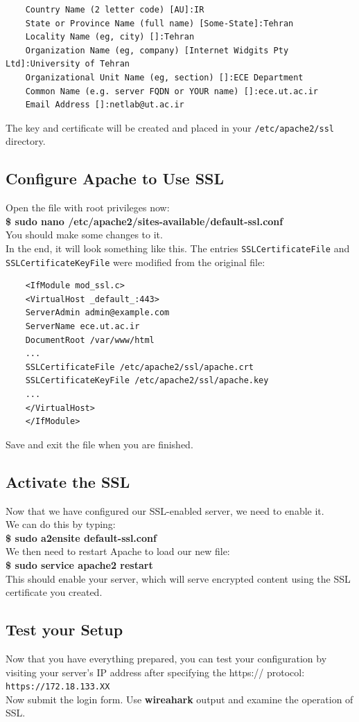 \documentclass[10pt,a4paper]{article}
\numberwithin{equation}{section}
\numberwithin{figure}{section}
\numberwithin{table}{section}
\begin{document}
	\begin{verbatim}
	Country Name (2 letter code) [AU]:IR 
	State or Province Name (full name) [Some-State]:Tehran 
	Locality Name (eg, city) []:Tehran 
	Organization Name (eg, company) [Internet Widgits Pty Ltd]:University of Tehran 
	Organizational Unit Name (eg, section) []:ECE Department 
	Common Name (e.g. server FQDN or YOUR name) []:ece.ut.ac.ir 
	Email Address []:netlab@ut.ac.ir 
	\end{verbatim}
	The key and certificate will be created and placed in your \texttt{/etc/apache2/ssl} directory.
	\subsection{Configure Apache to Use SSL}
	Open the file with root privileges now:\\
	\textbf{\$ sudo nano /etc/apache2/sites-available/default-ssl.conf} \\
	You should make some changes to it. \\
	In the end, it will look something like this. The entries \texttt{SSLCertificateFile} and \texttt{SSLCertificateKeyFile}  were modified from the original file: \\
	\begin{verbatim}
	<IfModule mod_ssl.c>
	<VirtualHost _default_:443>
	ServerAdmin admin@example.com
	ServerName ece.ut.ac.ir 
	DocumentRoot /var/www/html
	...
	SSLCertificateFile /etc/apache2/ssl/apache.crt
	SSLCertificateKeyFile /etc/apache2/ssl/apache.key
	...
	</VirtualHost>
	</IfModule>
	\end{verbatim}
	Save and exit the file when you are finished.
	\subsection{Activate the SSL}
	Now that we have configured our SSL-enabled server, we need to enable it. \\
	We can do this by typing: \\
	\textbf{\$ sudo a2ensite default-ssl.conf} \\
	We then need to restart Apache to load our new file:\\
	\textbf{\$ sudo service apache2 restart} \\
	This should enable your server, which will serve encrypted content using the SSL certificate you created.
	\subsection{Test your Setup}
	Now that you have everything prepared, you can test your configuration by visiting your server's IP address after specifying the https:// protocol: \\
	\texttt{https://172.18.133.XX} \\
	Now submit the login form.
	Use \textbf{wireahark} output and examine the operation of SSL.
	
\end{document}
